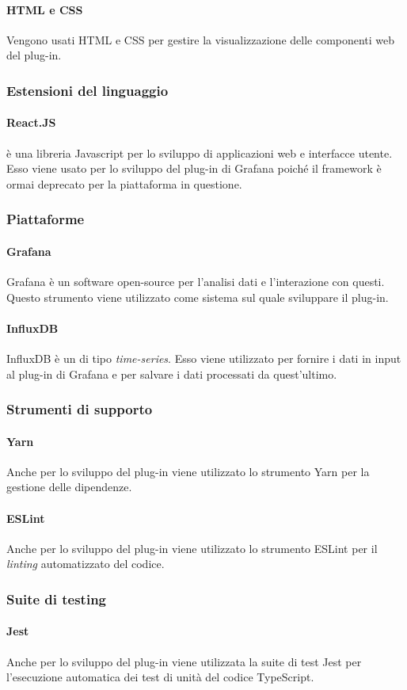 \documentclass[../manuale-sviluppatore.tex]{subfiles}
\begin{document}
\paragraph{HTML e CSS}
Vengono usati HTML e CSS per gestire la visualizzazione delle componenti web del plug-in.

\subsubsection{Estensioni del linguaggio}
\paragraph{React.JS}
 è una libreria Javascript per lo sviluppo di applicazioni web e interfacce utente. Esso viene usato per lo sviluppo del plug-in di Grafana poiché il framework  è ormai deprecato per la piattaforma in questione.

\subsubsection{Piattaforme}
\paragraph{Grafana}
Grafana è un software open-source per l'analisi dati e l'interazione con questi. Questo strumento viene utilizzato come sistema sul quale sviluppare il plug-in.

\paragraph{InfluxDB}
InfluxDB è un  di tipo \textit{time-series}. Esso viene utilizzato per fornire i dati in input al plug-in di Grafana e per salvare i dati processati da quest'ultimo.

\subsubsection{Strumenti di supporto}
\paragraph{Yarn}
Anche per lo sviluppo del plug-in viene utilizzato lo strumento Yarn per la gestione delle dipendenze.

\paragraph{ESLint}
Anche per lo sviluppo del plug-in viene utilizzato lo strumento ESLint per il \textit{linting} automatizzato del codice.

\subsubsection{Suite di testing}
\paragraph{Jest}
Anche per lo sviluppo del plug-in viene utilizzata la suite di test Jest per l'esecuzione automatica dei test di unità del codice TypeScript.
\end{document}
